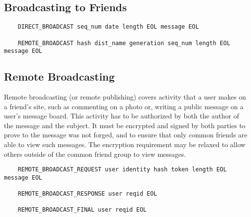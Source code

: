 \documentclass[letterpaper,11pt,oneside]{article}
\begin{document}
\subsection{Broadcasting to Friends}

\vspace{10pt}
\begin{verbatim}
    DIRECT_BROADCAST seq_num date length EOL message EOL

    REMOTE_BROADCAST hash dist_name generation seq_num length EOL message EOL
\end{verbatim}

\subsection{Remote Broadcasting}

Remote broadcasting (or remote publishing) covers activity that a user makes on
a friend's site, such as commenting on a photo or, writing a public message on
a user's message board. This activity has to be authorized by both the author
of the message and the subject. It must be encrypted and signed by both parties
to prove to the message was not forged, and to ensure that only common friends
are able to view such messages. The encryption requirement may be relaxed to
allow others outside of the common friend group to view messages.

\vspace{10pt}
\begin{verbatim}
    REMOTE_BROADCAST_REQUEST user identity hash token length EOL message EOL

    REMOTE_BROADCAST_RESPONSE user reqid EOL 

    REMOTE_BROADCAST_FINAL user reqid EOL 
\end{verbatim}
\end{document}
